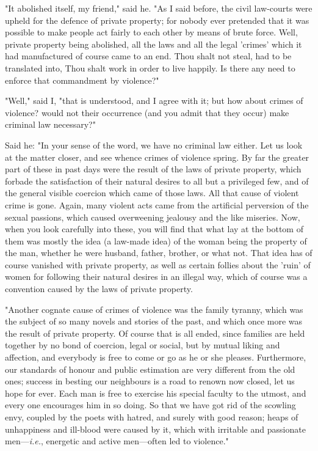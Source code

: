 "It abolished itself, my friend," said he. "As I said before, the civil
law-courts were upheld for the defence of private property; for nobody
ever pretended that it was possible to make people act fairly to each
other by means of brute force. Well, private property being abolished,
all the laws and all the legal 'crimes' which it had manufactured of
course came to an end. Thou shalt not steal, had to be translated into,
Thou shalt work in order to live happily. Is there any need to enforce
that commandment by violence?"

"Well," said I, "that is understood, and I agree with it; but how about
crimes of violence? would not their occurrence (and you admit that they
occur) make criminal law necessary?"

Said he: "In your sense of the word, we have no criminal law either. Let
us look at the matter closer, and see whence crimes of violence spring.
By far the greater part of these in past days were the result of the
laws of private property, which forbade the satisfaction of their
natural desires to all but a privileged few, and of the general visible
coercion which came of those laws. All that cause of violent crime is
gone. Again, many violent acts came from the artificial perversion of
the sexual passions, which caused overweening jealousy and the like
miseries. Now, when you look carefully into these, you will find that
what lay at the bottom of them was mostly the idea (a law-made idea) of
the woman being the property of the man, whether he were husband,
father, brother, or what not. That idea has of course vanished with
private property, as well as certain follies about the 'ruin' of women
for following their natural desires in an illegal way, which of course
was a convention caused by the laws of private property.

"Another cognate cause of crimes of violence was the family tyranny,
which was the subject of so many novels and stories of the past, and
which once more was the result of private property. Of course that is
all ended, since families are held together by no bond of coercion,
legal or social, but by mutual liking and affection, and everybody is
free to come or go as he or she pleases. Furthermore, our standards of
honour and public estimation are very different from the old ones;
success in besting our neighbours is a road to renown now closed, let us
hope for ever. Each man is free to exercise his special faculty to the
utmost, and every one encourages him in so doing. So that we have got
rid of the scowling envy, coupled by the poets with hatred, and surely
with good reason; heaps of unhappiness and ill-blood were caused by it,
which with irritable and passionate men---\emph{i.e.}, energetic and
active men---often led to violence."

